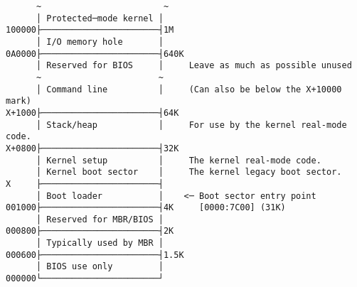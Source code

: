 \documentclass[varwidth=50em]{standalone}
\begin{document}
\begin{verbatim}
      ~                        ~
      │ Protected─mode kernel │
100000├───────────────────────┤1M
      │ I/O memory hole       │
0A0000├───────────────────────┤640K
      │ Reserved for BIOS     │     Leave as much as possible unused
      ~                       ~
      │ Command line          │     (Can also be below the X+10000 mark)
X+1000├───────────────────────┤64K
      │ Stack/heap            │     For use by the kernel real-mode code.
X+0800├───────────────────────┤32K     
      │ Kernel setup          │     The kernel real-mode code.
      │ Kernel boot sector    │     The kernel legacy boot sector.
X     ├───────────────────────┤
      │ Boot loader           │    <─ Boot sector entry point 
001000├───────────────────────┤4K     [0000:7C00] (31K)
      │ Reserved for MBR/BIOS │
000800├───────────────────────┤2K
      │ Typically used by MBR │
000600├───────────────────────┤1.5K
      │ BIOS use only         │
000000└───────────────────────┘
\end{verbatim}
\end{document}
